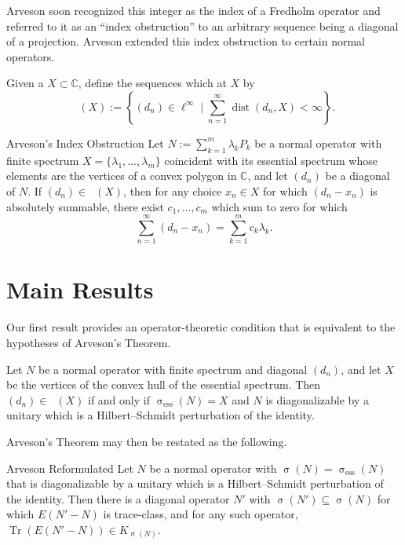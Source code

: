 \documentclass{article}
\DeclareMathOperator{\dist}{dist}
\DeclareMathOperator{\Lim}{Lim^1}
\DeclareMathOperator{\trace}{Tr}
\DeclareMathOperator{\spec}{\sigma}
\newcommand{\essspec}{\spec_{\mathrm{ess}}}
\begin{document}
Arveson soon recognized this integer as the index of a Fredholm operator and referred to it as an ``index obstruction'' to an arbitrary sequence being a diagonal of a projection.
Arveson extended this index obstruction to certain normal operators.

\begin{definition}
  Given a $X \subset \mathbb{C}$, define the sequences which  at $X$ by
  \begin{equation*}
    \Lim (X) := \left\{ (d_n) \in \ell^{\infty} \mid \sum_{n=1}^{\infty} \dist(d_n,X) < \infty \right\}.
  \end{equation*}
\end{definition}

\begin{thmcustom}{Arveson's Index Obstruction}
  Let $N := \sum_{k=1}^m \lambda_k P_k$ be a normal operator with finite spectrum $X = \{\lambda_1,\ldots,\lambda_m\}$ coincident with its essential spectrum whose elements are the vertices of a convex polygon in $\mathbb{C}$, and let $(d_n)$ be a diagonal of $N$.
  If $(d_n) \in \Lim (X)$, then for any choice $x_n \in X$ for which $(d_n-x_n)$ is absolutely summable, there exist  $c_1,\ldots,c_m$ which sum to zero for which
  \begin{equation*}
    \sum_{n=1}^{\infty} (d_n-x_n) = \sum_{k=1}^m c_k \lambda_k.
  \end{equation*}
\end{thmcustom}


\section*{Main Results}

Our first result provides an operator-theoretic condition that is equivalent to the hypotheses of Arveson's Theorem.

\begin{theorem}
  Let $N$ be a normal operator with finite spectrum and diagonal $(d_n)$, and let $X$ be the vertices of the convex hull of the essential spectrum.
  Then $(d_n) \in \Lim(X)$ if and only if $\essspec(N) = X$ and $N$ is diagonalizable by a unitary which is a Hilbert--Schmidt perturbation of the identity.
\end{theorem}

Arveson's Theorem may then be restated as the following.

\begin{thmcustom}{Arveson Reformulated}
  Let $N$ be a normal operator with $\spec(N) = \essspec(N)$ that is diagonalizable by a unitary which is a Hilbert--Schmidt perturbation of the identity.
  Then there is a diagonal operator $N'$ with $\spec(N') \subseteq \spec(N)$ for which $E(N'-N)$ is trace-class, and for any such operator, $\trace(E(N'-N)) \in K_{\spec(N)}$.
\end{thmcustom}
\end{document}
